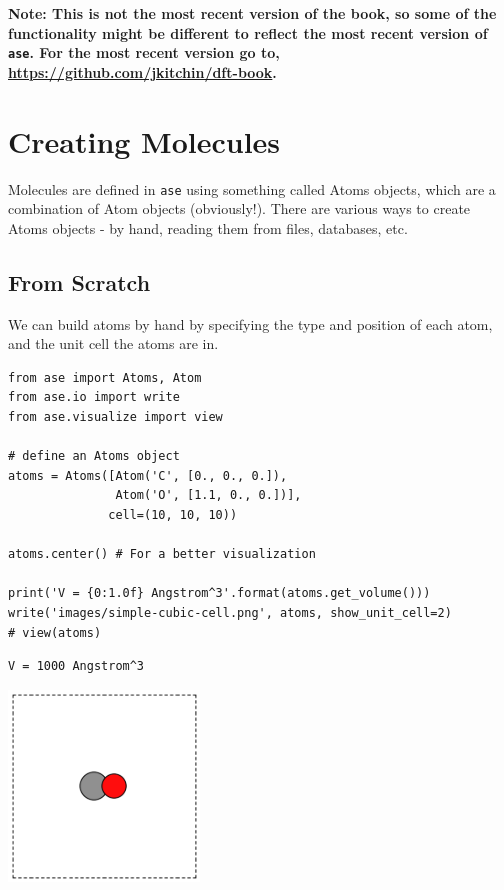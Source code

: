 \documentclass[11pt]{article}
\begin{document}
\textbf{Note: This is not the most recent version of the book, so some of the functionality might be different to reflect the most recent version of \texttt{ase}. For the most recent version go to, \url{https://github.com/jkitchin/dft-book}.}

\section{Creating Molecules}
\label{sec-4}

Molecules are defined in \texttt{ase} using something called Atoms objects, which are a combination of Atom objects (obviously!). There are various ways to create Atoms objects - by hand, reading them from files, databases, etc.

\subsection{From Scratch}
\label{sec-4-1}

We can build atoms by hand by specifying the type and position of each atom, and the unit cell the atoms are in.

\begin{verbatim}
from ase import Atoms, Atom
from ase.io import write
from ase.visualize import view

# define an Atoms object
atoms = Atoms([Atom('C', [0., 0., 0.]),
               Atom('O', [1.1, 0., 0.])],
              cell=(10, 10, 10))

atoms.center() # For a better visualization

print('V = {0:1.0f} Angstrom^3'.format(atoms.get_volume()))
write('images/simple-cubic-cell.png', atoms, show_unit_cell=2)
# view(atoms)
\end{verbatim}

\begin{verbatim}
V = 1000 Angstrom^3
\end{verbatim}

\includegraphics[width=2in]{./images/simple-cubic-cell.png}
\end{document}

